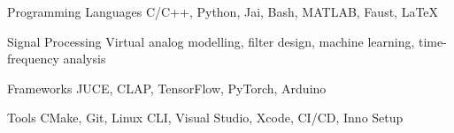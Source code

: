 

\begin{cvskills}

    \cvskill
    {Programming Languages} %
    {C/C++, Python, Jai, Bash, MATLAB, Faust, LaTeX} %

    \cvskill
    {Signal Processing} %
    {Virtual analog modelling, filter design, machine learning, time-frequency analysis} %

    \cvskill
    {Frameworks} %
    {JUCE, CLAP, TensorFlow, PyTorch, Arduino} %

    \cvskill
    {Tools} %
    {CMake, Git, Linux CLI, Visual Studio, Xcode, CI/CD, Inno Setup} %

\end{cvskills}
